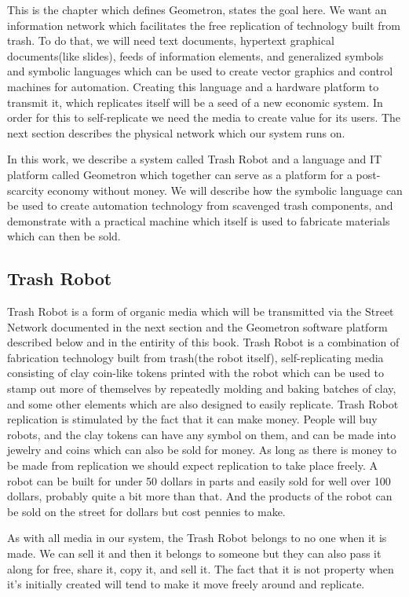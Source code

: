 This is the chapter which defines Geometron, states the goal here.  We want an information network which facilitates the free replication of technology built from trash.  To do that, we will need text documents, hypertext graphical documents(like slides), feeds of information elements, and generalized symbols and symbolic languages which can be used to create vector graphics and control machines for automation.  Creating this language and a hardware platform to transmit it, which replicates itself will be a seed of a new economic system.  In order for this to self-replicate we need the media to create value for its users.  The next section describes the physical network which our system runs on.   

In this work, we describe a system called Trash Robot and a language and IT platform called Geometron which together can serve as a platform for a post-scarcity economy without money.  We will describe how the symbolic language can be used to create automation technology from scavenged trash components, and demonstrate with a practical machine which itself is used to fabricate materials which can then be sold.  

\subsection{Trash Robot}

Trash Robot is a form of organic media which will be transmitted via the Street Network documented in the next section and the Geometron software platform described below and in the entirity of this book.  Trash Robot is a combination of fabrication technology built from trash(the robot itself), self-replicating media consisting of clay coin-like tokens printed with the robot which can be used to stamp out more of themselves by repeatedly molding and baking batches of clay, and some other elements which are also designed to easily replicate.  Trash Robot replication is stimulated by the fact that it can make money.  People will buy robots, and the clay tokens can have any symbol on them, and can be made into jewelry and coins which can also be sold for money.  As long as there is money to be made from replication we should expect replication to take place freely.  A robot can be built for under 50 dollars in parts and easily sold for well over 100 dollars, probably quite a bit more than that.  And the products of the robot can be sold on the street for dollars but cost pennies to make.  

As with all media in our system, the Trash Robot belongs to no one when it is made.  We can sell it and then it belongs to someone but they can also pass it along for free, share it, copy it, and sell it.  The fact that it is not property when it's initially created will tend to make it move freely around and replicate.



